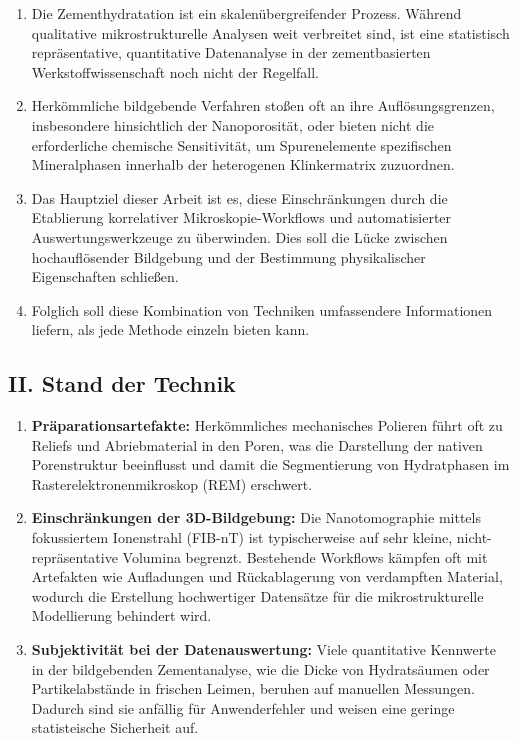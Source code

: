 \documentclass[11pt, a4paper]{article}
\begin{document}
\begin{enumerate}[label=\textbf{\arabic*.}, leftmargin=1.5cm, labelsep=0.5cm, itemsep=0.5em]
    \item Die Zementhydratation ist ein skalenübergreifender Prozess.
    Während qualitative mikrostrukturelle Analysen weit verbreitet sind, ist eine statistisch repräsentative, quantitative Datenanalyse in der zementbasierten Werkstoffwissenschaft noch nicht der Regelfall.
    \item Herkömmliche bildgebende Verfahren stoßen oft an ihre Auflösungsgrenzen, insbesondere hinsichtlich der Nanoporosität, oder bieten nicht die erforderliche chemische Sensitivität, um Spurenelemente spezifischen Mineralphasen innerhalb der heterogenen Klinkermatrix zuzuordnen.
    \item Das Hauptziel dieser Arbeit ist es, diese Einschränkungen durch die Etablierung korrelativer Mikroskopie-Workflows und automatisierter Auswertungswerkzeuge zu überwinden.
    Dies soll die Lücke zwischen hochauflösender Bildgebung und der Bestimmung physikalischer Eigenschaften schließen.
    \item Folglich soll diese Kombination von Techniken umfassendere Informationen liefern, als jede Methode einzeln bieten kann.
\end{enumerate}

\subsection*{II. Stand der Technik}

\begin{enumerate}[label=\textbf{\arabic*.}, leftmargin=1.5cm, labelsep=0.5cm, itemsep=0.5em, resume]
    \item \textbf{Präparationsartefakte:} Herkömmliches mechanisches Polieren führt oft zu Reliefs und Abriebmaterial in den Poren, was die Darstellung der nativen Porenstruktur beeinflusst und damit die Segmentierung von Hydratphasen im Rasterelektronenmikroskop (REM) erschwert.
    \item \textbf{Einschränkungen der 3D-Bildgebung:} Die Nano\-to\-mo\-gra\-phie mittels fokussiertem Ionenstrahl (FIB-nT) ist typischerweise auf sehr kleine, nicht-repräsentative Volumina begrenzt.
    Bestehende Workflows kämpfen oft mit Artefakten wie Aufladungen und Rückablagerung von verdampften Material, wodurch die Erstellung hochwertiger Datensätze für die mikrostrukturelle Modellierung behindert wird.
    \item \textbf{Subjektivität bei der Datenauswertung:} Viele quantitative Kennwerte in der bildgebenden Zementanalyse, wie die Dicke von Hydratsäumen oder Partikelabstände in frischen Leimen, beruhen auf manuellen Messungen. Dadurch sind sie anfällig für Anwenderfehler und weisen eine geringe statisteische Sicherheit auf.
\end{enumerate}
\end{document}
